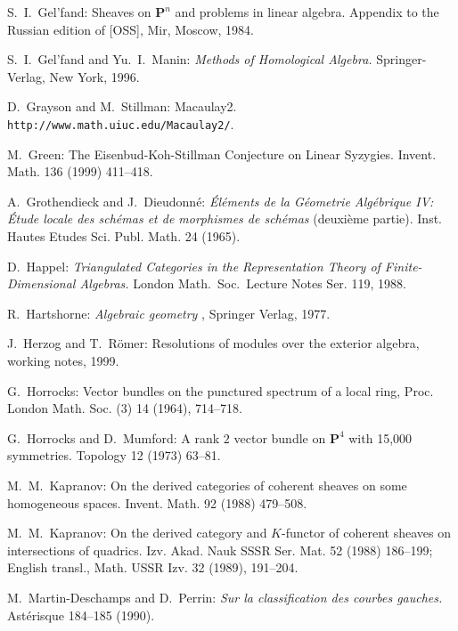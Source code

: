 \documentclass{tran-l}
\theoremstyle{plain}
\theoremstyle{remark}
\theoremstyle{definition}
\begin{document}
\begin{thebibliography}{EPSW}
S.~I.~Gel'fand: Sheaves on $\mathbf{P}^{n}$ and problems in linear algebra.
Appendix to the Russian edition
of [OSS], Mir, Moscow, 1984.

S.~I.~Gel'fand and Yu.~I.~Manin: {\em Methods of Homological Algebra.\/}
Springer-Verlag, New York, 1996.

D.~Grayson and M.~Stillman: Macaulay2. {\tt
http://www.math.uiuc.edu/Macaulay2/}.

M.~Green: The Eisenbud-Koh-Stillman Conjecture on Linear Syzygies.
Invent. Math. 136 (1999) 411--418.

A.~Grothendieck and J.~Dieudonn\'{e}:
{\em \'{E}l\'{e}ments de la G\'{e}ometrie Alg\'{e}brique IV:
\'{E}tude locale des sch\'{e}mas et de morphismes de sch\'{e}mas}
(deuxi\`{e}me partie). Inst. Hautes Etudes Sci. Publ. Math. 24 (1965).

D.~Happel: {\em Triangulated Categories in the Representation Theory
of Finite-Dimensional Algebras.\/} London
Math.~Soc.~Lecture Notes Ser. 119, 1988.

R.~Hartshorne: {\em Algebraic geometry \/}, Springer Verlag, 1977.

J.~Herzog and T.~R\"{o}mer: Resolutions of modules over the exterior algebra,
working notes, 1999.

G.~Horrocks: Vector bundles on the punctured spectrum of a local ring, Proc. 
London Math. Soc.
(3) 14 (1964), 714--718.

G.~Horrocks and D.~Mumford: A rank $2$ vector bundle on $\mathbf{P}^{4}$ with 
15,000 symmetries. Topology 12 (1973) 63--81.

M.~M.~Kapranov:
On the derived categories of coherent sheaves on some homogeneous spaces.
Invent. Math. 92 (1988) 479--508.

M.~M.~Kapranov:
On the derived category and $K$-functor
of coherent sheaves on intersections of quadrics. Izv. Akad.
Nauk SSSR Ser. Mat. 52 (1988) 186--199; English transl., Math. USSR Izv. 32
(1989), 191--204.

M.~Martin-Deschamps and D.~Perrin: {\sl Sur la classification des courbes 
gauches.\/}
Ast\'{e}risque 184--185 (1990).


\end{thebibliography}
\end{document}
